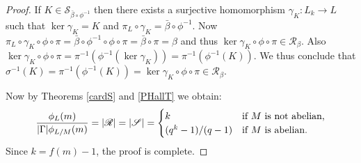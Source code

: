 \begin{proof}
    If $K \in \mathscr{S}_{\bar{\beta} \circ \phi^{-1}}$ then there exists a surjective homomorphism $\gamma_K \colon L_k \rightarrow L$ such that $\ker \gamma_K = K$ and $\pi_L \circ \gamma_K = \bar{\beta} \circ \phi^{-1}$. 
    Now $ \pi_L \circ \gamma_K \circ \phi \circ \pi = \bar{\beta} \circ \phi^{-1} \circ \phi \circ \pi = \bar{\beta} \circ \pi = \beta$ and thus $\ker{\gamma_K \circ \phi \circ \pi} \in \mathscr{R}_\beta$. Also $\ker{\gamma_K \circ \phi \circ \pi} = \pi^{-1}(\phi^{-1}(\ker \gamma_K)) = \pi^{-1}(\phi^{-1}(K))$.
    We thus conclude that $\sigma^{-1}(K) = \pi^{-1}(\phi^{-1}(K)) = \ker{\gamma_K \circ \phi \circ \pi} \in \mathscr{R}_\beta$. 

    Now by Theorems \ref{cardS} and \ref{PHallT} we obtain:
    $$
    \frac{\phi_L(m)}{| \Gamma |\phi_{L/M}(m)} = | \mathscr{R} | = | \mathscr{S} | = 
    \begin{cases}
        k & \text{if } M \text{ is not abelian,} \\
        (q^k-1)/(q-1) & \text{if } M \text{ is abelian.} \\
    \end{cases}
    $$
    Since $k = f(m)-1$, the proof is complete.    
\end{proof}